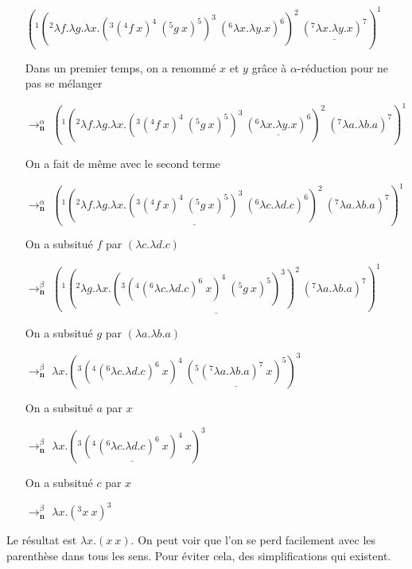\documentclass[10pt,a4paper]{article}
\begin{document}
				\begin{itemize}
					\item[] $(^{1}(^{2}\lambda f.\lambda g.\lambda x.(^{3}(^{4}f~x)^{4}~(^{5}g~x)^{5})^{3}~(^{6}\lambda x.\lambda y.x)^{6})^{2}~\underline{(^{7}\lambda x.\lambda y.x)^{7}})^{1}$
					\item[] Dans un premier temps, on a renommé $x$ et $y$ grâce à $\alpha$-réduction pour ne pas se mélanger
					\item[$\rightarrow^{\alpha}_{\textbf{n}}$] $(^{1}(^{2}\lambda f.\lambda g.\lambda x.(^{3}(^{4}f~x)^{4}~(^{5}g~x)^{5})^{3}~\underline{(^{6}\lambda x.\lambda y.x)^{6}})^{2}~(^{7}\lambda a.\lambda b.a)^{7})^{1}$
					
					\item[] On a fait de même avec le second terme
					\item[$\rightarrow^{\alpha}_{\textbf{n}}$] $(^{1}\underline{(^{2}\lambda f.\lambda g.\lambda x.(^{3}(^{4}f~x)^{4}~(^{5}g~x)^{5})^{3}~(^{6}\lambda c.\lambda d.c)^{6})^{2}}~(^{7}\lambda a.\lambda b.a)^{7})^{1}$
					
					\item[] On a subsitué $f$ par $(\lambda c.\lambda d.c)$
					\item[$\rightarrow^{\beta}_{\textbf{n}}$] $\underline{(^{1}(^{2}\lambda g.\lambda x.(^{3}(^{4}(^{6}\lambda c.\lambda d.c)^{6}~x)^{4}~(^{5}g~x)^{5})^{3})^{2}~(^{7}\lambda a.\lambda b.a)^{7})^{1}}$
					
					\item[] On a subsitué $g$ par $(\lambda a.\lambda b.a)$
					\item[$\rightarrow^{\beta}_{\textbf{n}}$] $\lambda x.(^{3}(^{4}(^{6}\lambda c.\lambda d.c)^{6}~x)^{4}~\underline{(^{5}(^{7}\lambda a.\lambda b.a)^{7}~x)^{5}})^{3}$
					
					\item[] On a subsitué $a$ par $x$
					\item[$\rightarrow^{\beta}_{\textbf{n}}$] $\lambda x.(^{3}\underline{(^{4}(^{6}\lambda c.\lambda d.c)^{6}~x)^{4}}~x)^{3}$
					
					\item[] On a subsitué $c$ par $x$
					\item[$\rightarrow^{\beta}_{\textbf{n}}$] $\lambda x.(^{3}x~x)^{3}$
				\end{itemize}
				\bigbreak
				
				Le résultat est $\lambda x.(x~x)$. On peut voir que l'on se perd facilement avec les parenthèse dans tous les sens. Pour éviter cela, des simplifications qui existent.
				\newpage
				
\end{document}
